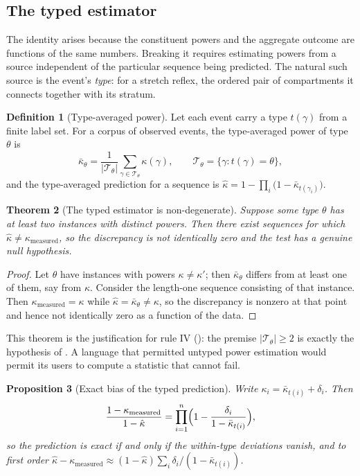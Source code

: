 \documentclass[11pt,twocolumn,a4paper]{article}
\theoremstyle{thmstyle}
\newtheorem{theorem}{Theorem}[section]
\newtheorem{proposition}[theorem]{Proposition}
\theoremstyle{definition}
\newtheorem{definition}[theorem]{Definition}
\theoremstyle{remark}
\newcommand{\kap}{\kappa}
\newcommand{\abs}[1]{\lvert#1\rvert}
\begin{document}
\subsection{The typed estimator}

The identity arises because the constituent powers and the aggregate outcome
are functions of the same numbers. Breaking it requires estimating powers from
a source independent of the particular sequence being predicted. The natural
such source is the event's \emph{type}: for a stretch reflex, the ordered pair
of compartments it connects together with its stratum.

\begin{definition}[Type-averaged power]
\label{def:type-averaged}
Let each event carry a type $t(\gamma)$ from a finite label set. For a corpus
of observed events, the type-averaged power of type $\theta$ is
\[
\bar\kap_{\theta}
=\frac{1}{\abs{\mathcal{T}_{\theta}}}
 \sum_{\gamma\in\mathcal{T}_{\theta}}\kap(\gamma),
\qquad
\mathcal{T}_{\theta}=\{\gamma:t(\gamma)=\theta\},
\]
and the type-averaged prediction for a sequence is
$\hat\kap=1-\prod_{i}\bigl(1-\bar\kap_{t(\gamma_i)}\bigr)$.
\end{definition}

\begin{theorem}[The typed estimator is non-degenerate]
\label{thm:nondegenerate}
Suppose some type $\theta$ has at least two instances with distinct powers.
Then there exist sequences for which
$\hat\kap\ne\kap_{\mathrm{measured}}$, so the discrepancy is not identically
zero and the test has a genuine null hypothesis.
\end{theorem}

\begin{proof}
Let $\theta$ have instances with powers $\kap\ne\kap'$; then
$\bar\kap_{\theta}$ differs from at least one of them, say from $\kap$.
Consider the length-one sequence consisting of that instance. Then
$\kap_{\mathrm{measured}}=\kap$ while $\hat\kap=\bar\kap_{\theta}\ne\kap$, so
the discrepancy is nonzero at that point and hence not identically zero as a
function of the data.
\end{proof}

This theorem is the justification for rule IV (): the
premise $\abs{\mathcal{T}_{\theta}}\ge2$ is exactly the hypothesis of
. A language that permitted untyped power estimation
would permit its users to compute a statistic that cannot fail.

\begin{proposition}[Exact bias of the typed prediction]
\label{prop:bias}
Write $\kap_i=\bar\kap_{t(i)}+\delta_i$. Then
\[
\frac{1-\kap_{\mathrm{measured}}}{1-\hat\kap}
=\prod_{i=1}^{n}\Bigl(1-\frac{\delta_i}{1-\bar\kap_{t(i)}}\Bigr),
\]
so the prediction is exact if and only if the within-type deviations vanish,
and to first order
$\hat\kap-\kap_{\mathrm{measured}}\approx
(1-\hat\kap)\sum_i \delta_i/(1-\bar\kap_{t(i)})$.
\end{proposition}
\end{document}
